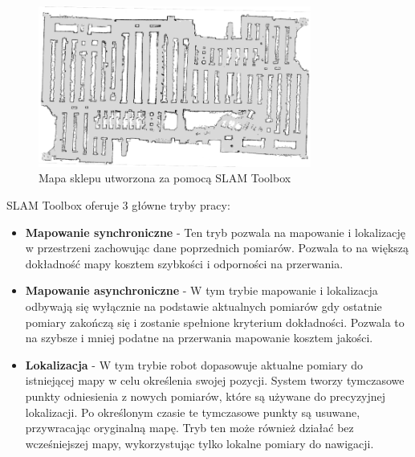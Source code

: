 \documentclass[a4paper,twoside,12pt]{book}
\begin{document}
\begin{figure}[h]
	\centering
	\includegraphics[width=0.8\textwidth]{images/sklep.png}
	\caption{Mapa sklepu utworzona za pomocą SLAM Toolbox}
	\label{fig:sklep}
	\end{figure}

SLAM Toolbox oferuje 3 główne tryby pracy:
\begin{itemize}
	\item \textbf{Mapowanie synchroniczne} - Ten tryb pozwala na mapowanie i lokalizację w przestrzeni zachowując dane poprzednich pomiarów. Pozwala to na większą dokładność mapy kosztem szybkości i odporności na przerwania.
	\item \textbf{Mapowanie asynchroniczne} - W tym trybie mapowanie i lokalizacja odbywają się wyłącznie na podstawie aktualnych pomiarów gdy ostatnie pomiary zakończą się i zostanie spełnione kryterium dokładności. Pozwala to na szybsze i mniej podatne na przerwania mapowanie kosztem jakości.
	\item \textbf{Lokalizacja} - W tym trybie robot dopasowuje aktualne pomiary do istniejącej mapy w celu określenia swojej pozycji. System tworzy tymczasowe punkty odniesienia z nowych pomiarów, które są używane do precyzyjnej lokalizacji. Po określonym czasie te tymczasowe punkty są usuwane, przywracając oryginalną mapę. Tryb ten może również działać bez wcześniejszej mapy, wykorzystując tylko lokalne pomiary do nawigacji.
\end{itemize}

\newpage
\end{document}
